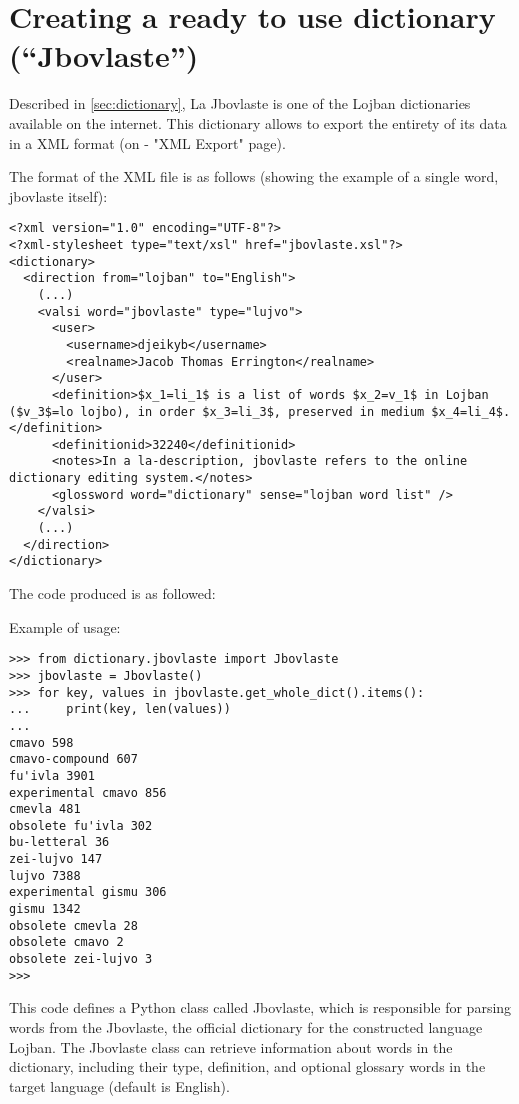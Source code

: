 \chapter{Creating a ready to use dictionary (``Jbovlaste'')}
\label{sub:creating_a_dictionary}

Described in \ref{sec:dictionary}, La Jbovlaste is one of the Lojban dictionaries available on the internet.
This dictionary allows to export the entirety of its data in a XML format (on \cite{jbovlaste} - "XML Export" page).\\

\newpage

The format of the XML file is as follows (showing the example of a single word, jbovlaste itself): \\

\begin{lstlisting}
<?xml version="1.0" encoding="UTF-8"?>
<?xml-stylesheet type="text/xsl" href="jbovlaste.xsl"?>
<dictionary>
  <direction from="lojban" to="English">
    (...)
    <valsi word="jbovlaste" type="lujvo">
      <user>
        <username>djeikyb</username>
        <realname>Jacob Thomas Errington</realname>
      </user>
      <definition>$x_1=li_1$ is a list of words $x_2=v_1$ in Lojban ($v_3$=lo lojbo), in order $x_3=li_3$, preserved in medium $x_4=li_4$.</definition>
      <definitionid>32240</definitionid>
      <notes>In a la-description, jbovlaste refers to the online dictionary editing system.</notes>
      <glossword word="dictionary" sense="lojban word list" />
    </valsi>
    (...)
  </direction>
</dictionary>
\end{lstlisting}

\newpage

The code produced is as followed:



Example of usage:

\begin{lstlisting}
>>> from dictionary.jbovlaste import Jbovlaste
>>> jbovlaste = Jbovlaste()
>>> for key, values in jbovlaste.get_whole_dict().items():
...     print(key, len(values))
...
cmavo 598
cmavo-compound 607
fu'ivla 3901
experimental cmavo 856
cmevla 481
obsolete fu'ivla 302
bu-letteral 36
zei-lujvo 147
lujvo 7388
experimental gismu 306
gismu 1342
obsolete cmevla 28
obsolete cmavo 2
obsolete zei-lujvo 3
>>>
\end{lstlisting}

This code defines a Python class called Jbovlaste, which is responsible for parsing words from the Jbovlaste, the official dictionary for the constructed language Lojban. The Jbovlaste class can retrieve information about words in the dictionary, including their type, definition, and optional glossary words in the target language (default is English).

